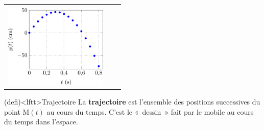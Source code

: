 \documentclass[../../main/main.tex]{subfiles}
\begin{document}
\begin{tcb}
\begin{center}
\begin{tabularx}{\linewidth}{Y|Y|Y}
\begin{center}
			\end{center}
			 &
			\begin{center}
				\includegraphics[height=4cm]{x_vo}
				\\
				\includegraphics[height=4cm]{y_vo}%
				\vspace*{-25pt}
			\end{center}
		\end{tabularx}
	\end{center}
\end{tcb}

\begin{tcb}(defi)<lftt>{Trajectoire}
	La \textbf{trajectoire} est l'ensemble des positions successives du point
	M$(t)$ au cours du temps. C'est le «~dessin~» fait par le mobile au cours du
	temps dans l'espace.
\end{tcb}
\end{document}
